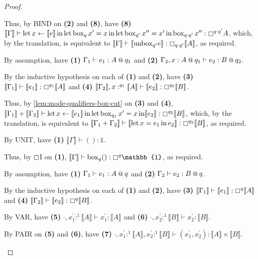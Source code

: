 \documentclass[acmsmall,screen,nonacm]{acmart}
\makeatletter
\DeclareMathOperator{\llet}{\text{let}}
\DeclareMathOperator{\lin}{\text{in}}
\DeclareMathOperator{\bbox}{\text{box}}
\newcommand{\at}{\mathbin{\mbox{\small\ensuremath{@}}}}
\newcommand{\unit}{\mathbb{1}}
\newcommand{\tee}{\vdash}
\newcommand{\sem}[1]{\llbracket #1 \rrbracket}
\makeatother
\begin{document}
\begin{proof}
\begin{description}
    Thus, by BIND on \textbf{(2)} and \textbf{(8)}, have \textbf{(8)} $\sem{\Gamma} \tee \llet x \leftarrow \sem{e} \lin \llet \bbox_q x^\prime = x \lin \llet \bbox_{q^\prime} x^{\prime\prime} = x^\prime \lin \bbox_{q \cdot q^\prime} x^{\prime\prime} : \boxempty^{q \cdot q^\prime} A$, which, by the translation, is equivalent to $\sem{\Gamma} \tee \sem{\mathrm{unbox}_{q^\prime} e} : \boxempty_{q \cdot q^\prime} \sem{A}$, as required.
    \\
    \item[Case LET.]
    By assumption, have \textbf{(1)} $\Gamma_1 \tee e_1 : A \at q_1$ and \textbf{(2)} $\Gamma_2, x : A \at q_1 \tee e_2 : B \at q_2$.
    
    By the inductive hypothesis on each of \textbf{(1)} and \textbf{(2)}, have \textbf{(3)} $\sem{\Gamma_1} \tee \sem{e_1} : \boxempty^{q_1} \sem{A}$ and \textbf{(4)} $\sem{\Gamma_2}, x :^{q_1} \sem{A} \tee \sem{e_2} : \boxempty^{q_2} \sem{B}$.

    Thus, by \ref{lem:mode-qualifiers-box-cut} on \textbf{(3)} and \textbf{(4)}, $\sem{\Gamma_1} + \sem{\Gamma_2} \tee \llet x \leftarrow \sem{e_1} \lin \llet \bbox_{q_1} x^\prime = x \lin \sem{e_2} : \boxempty^{q_2} \sem{B}$, which, by the translation, is equivalent to $\sem{\Gamma_1 + \Gamma_2} \tee \sem{\llet x = e_1 \lin e_2} : \boxempty^{q_2} \sem{B}$, as required.
    \\
    \item[Case UNIT.]
    By UNIT, have \textbf{(1)} $\sem{\Gamma} \tee () : \unit$.      
    
    Thus, by $\boxempty$I on \textbf{(1)}, $\sem{\Gamma} \tee \mathrm{box}_q() : \boxempty^q \unit$, as required. 
    \\
    \item[Case PAIR.] 
    By assumption, have \textbf{(1)} $\Gamma_1 \tee e_1 : A \at q$ and \textbf{(2)} $\Gamma_2 \tee e_2 : B \at q$.

    By the inductive hypothesis on each of \textbf{(1)} and \textbf{(2)}, have \textbf{(3)} $\sem{\Gamma_1} \tee \sem{e_1} : \boxempty^q \sem{A}$ and \textbf{(4)} $\sem{\Gamma_2} \tee \sem{e_2} : \boxempty^q \sem{B}$.

    By VAR, have \textbf{(5)} $\cdot, x_1^\prime :^1 \sem{A} \tee x_1^\prime : \sem{A}$ and \textbf{(6)} $\cdot, x_2^\prime :^1 \sem{B} \tee x_2^\prime : \sem{B}$.

    By PAIR on \textbf{(5)} and \textbf{(6)}, have \textbf{(7)} $\cdot, x_1^\prime :^1 \sem{A}, x_2^\prime :^1 \sem{B} \tee (x_1^\prime, x_2^\prime) : \sem{A} \times \sem{B}$.


\end{description}
\end{proof}
\end{document}
